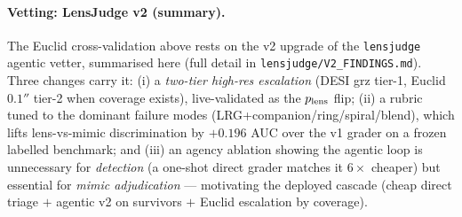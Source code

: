 

\paragraph{Vetting: LensJudge v2 (summary).}
\label{sec:v3vetting}
The Euclid cross-validation above rests on the v2 upgrade of the \texttt{lensjudge} agentic vetter,
summarised here (full detail in \texttt{lensjudge/V2\_FINDINGS.md}). Three changes carry it:
(i) a \emph{two-tier high-res escalation} (DESI grz tier-1, Euclid $0.1''$ tier-2 when coverage
exists), live-validated as the $p_{\rm lens}$ flip; (ii) a rubric tuned to the dominant failure
modes (LRG+companion/ring/spiral/blend), which lifts lens-vs-mimic discrimination by $+0.196$ AUC
over the v1 grader on a frozen labelled benchmark; and (iii) an agency ablation showing the agentic
loop is unnecessary for \emph{detection} (a one-shot direct grader matches it $6\times$ cheaper) but
essential for \emph{mimic adjudication} --- motivating the deployed cascade (cheap direct triage
$+$ agentic v2 on survivors $+$ Euclid escalation by coverage).

